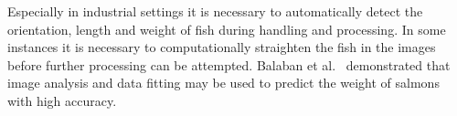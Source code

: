 \documentclass[conference]{IEEEtran}
\begin{document}
Especially in industrial settings it is necessary to automatically
detect the orientation, length and weight of fish during handling
and processing.
In some instances it is necessary to computationally straighten the
fish in the images \cite{MuozBenavent2018EnhancedFB} before further
processing can be attempted.
Balaban et al.~\cite{Balaban2010UsingIA} demonstrated that image analysis
and data fitting may be used to predict the weight of salmons with high
accuracy.
\end{document}
